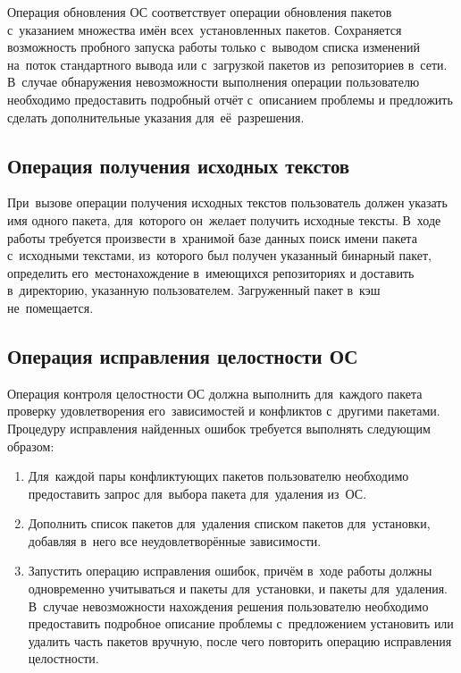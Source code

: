 Операция обновления ОС соответствует операции обновления пакетов с~указанием множества имён всех~установленных пакетов.
Сохраняется возможность пробного запуска работы только с~выводом списка изменений на~поток стандартного вывода или с~загрузкой пакетов из~репозиториев в~сети.
В~случае обнаружения невозможности выполнения операции пользователю необходимо предоставить подробный отчёт с~описанием проблемы и предложить сделать дополнительные указания для~её~разрешения.

\subsection{Операция получения исходных текстов}

При~вызове операции получения исходных текстов пользователь должен указать имя одного пакета,
для~которого он~желает получить исходные тексты.
В~ходе работы требуется произвести в~хранимой базе данных   поиск имени пакета с~исходными текстами,
из~которого был получен указанный бинарный пакет, 
определить его~местонахождение в~имеющихся репозиториях и доставить в~директорию, указанную пользователем.
Загруженный пакет в~кэш не~помещается.

\subsection{Операция исправления целостности ОС}

Операция контроля целостности ОС должна выполнить  для~каждого пакета  проверку удовлетворения его~зависимостей и конфликтов с~другими пакетами.
Процедуру исправления найденных ошибок требуется выполнять следующим образом:

\begin{enumerate}

\item {
Для~каждой пары конфликтующих пакетов пользователю необходимо предоставить запрос для~выбора пакета для~удаления из~ОС.
}

\item {
Дополнить список пакетов для~удаления списком пакетов для~установки,
добавляя в~него все неудовлетворённые зависимости.
}

\item {
Запустить операцию  исправления ошибок, 
причём в~ходе работы должны одновременно учитываться и пакеты для~установки, и пакеты для~удаления.
В~случае невозможности нахождения решения пользователю необходимо предоставить подробное описание проблемы с~предложением установить или удалить часть пакетов вручную,
после чего повторить операцию исправления целостности.
}

\end{enumerate}

